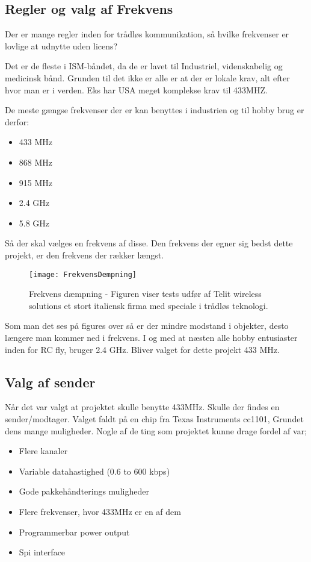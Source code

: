 \documentclass[Main]{subfiles}
\begin{document}
\subsection{Regler og valg af Frekvens}
Der er mange regler inden for trådløs kommunikation, så hvilke frekvenser er lovlige at udnytte uden licens?

Det er de fleste i ISM-båndet, da de er lavet til  Industriel, videnskabelig og medicinsk bånd. Grunden til det ikke er alle er at der er lokale krav, alt efter hvor man er i verden. Eks har USA meget komplekse krav til 433MHZ.\cite[s. 32]{Lov1}

De meste gængse frekvenser der er kan benyttes i industrien og til hobby brug er derfor:

\begin{itemize}
\item 433 MHz
\item 868 MHz
\item 915 MHz
\item 2.4 GHz
\item 5.8 GHz
\end{itemize}

Så der skal vælges en frekvens af disse.
Den frekvens der egner sig bedst dette projekt, er den frekvens der rækker længst. 

\begin{figure}[H]
\centering
\texttt{[image: FrekvensDempning]}
\caption{Frekvens dæmpning - Figuren viser tests udfør af Telit wireless solutions et stort italiensk firma med speciale i trådløs teknologi.}
\end{figure}




Som man det ses på figures over så er der mindre modstand i objekter, desto længere man kommer ned i frekvens.
I og med at næsten alle hobby entusiaster inden for RC fly, bruger 2.4 GHz. 
Bliver valget for dette projekt 433 MHz.

\subsection{Valg af sender}

Når det var valgt at projektet skulle benytte 433MHz. Skulle der findes en sender/modtager.
Valget faldt på en chip fra Texas Instruments cc1101, Grundet dens mange muligheder.
Nogle af de ting som projektet kunne drage fordel af var;

\begin{itemize}
\item Flere kanaler
\item Variable datahastighed (0.6 to 600 kbps)
\item Gode pakkehåndterings muligheder 
\item Flere frekvenser, hvor 433MHz er en af dem
\item Programmerbar power output
\item Spi interface
\end{itemize}
\end{document}
